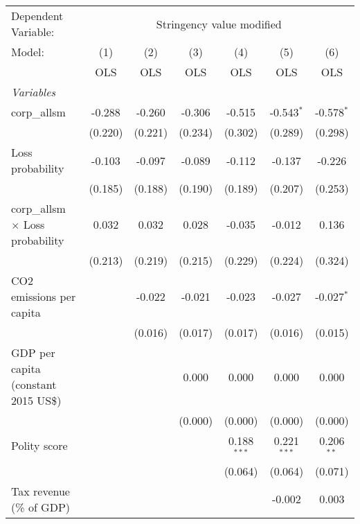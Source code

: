 
\begingroup
\centering
\begin{tabular}{lcccccc}
   \toprule
   Dependent Variable: & \multicolumn{6}{c}{Stringency value modified}\\
   Model:                                  & (1)     & (2)     & (3)     & (4)           & (5)           & (6)\\  
                                           &  OLS    & OLS     & OLS     & OLS           & OLS           & OLS\\  
   \midrule
   \emph{Variables}\\
   corp\_allsm                             & -0.288  & -0.260  & -0.306  & -0.515        & -0.543$^{*}$  & -0.578$^{*}$\\   
                                           & (0.220) & (0.221) & (0.234) & (0.302)       & (0.289)       & (0.298)\\   
   Loss probability                        & -0.103  & -0.097  & -0.089  & -0.112        & -0.137        & -0.226\\   
                                           & (0.185) & (0.188) & (0.190) & (0.189)       & (0.207)       & (0.253)\\   
   corp\_allsm $\times$ Loss probability   & 0.032   & 0.032   & 0.028   & -0.035        & -0.012        & 0.136\\   
                                           & (0.213) & (0.219) & (0.215) & (0.229)       & (0.224)       & (0.324)\\   
   CO2 emissions per capita                &         & -0.022  & -0.021  & -0.023        & -0.027        & -0.027$^{*}$\\   
                                           &         & (0.016) & (0.017) & (0.017)       & (0.016)       & (0.015)\\   
   GDP per capita (constant 2015 US\$)     &         &         & 0.000   & 0.000         & 0.000         & 0.000\\   
                                           &         &         & (0.000) & (0.000)       & (0.000)       & (0.000)\\   
   Polity score                            &         &         &         & 0.188$^{***}$ & 0.221$^{***}$ & 0.206$^{**}$\\   
                                           &         &         &         & (0.064)       & (0.064)       & (0.071)\\   
   Tax revenue (\% of GDP)                 &         &         &         &               & -0.002        & 0.003\\   

\end{tabular}

